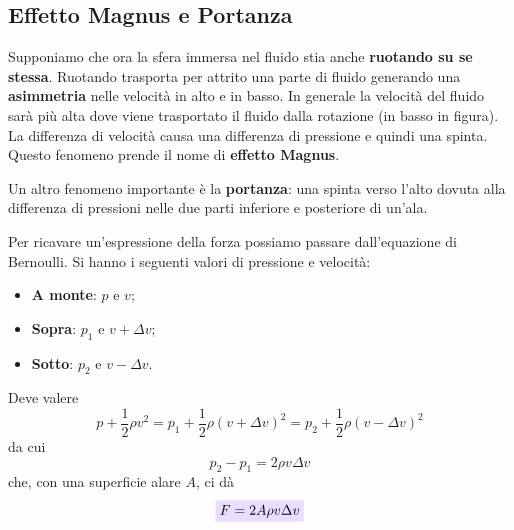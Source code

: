 \documentclass[x11names]{report}
\def\R{1.5}      %
\newcommand{\viola}[1]{\colorbox{yred}{$\displaystyle #1$}}
\begin{document}
	\subsection{Effetto Magnus e Portanza}
	Supponiamo che ora la sfera immersa nel fluido stia anche \textbf{ruotando su se stessa}. Ruotando trasporta per attrito una parte di fluido generando una \textbf{asimmetria} nelle velocità in alto e in basso. In generale la velocità del fluido sarà più alta dove viene trasportato il fluido dalla rotazione (in basso in figura). La differenza di velocità causa una differenza di pressione e quindi una spinta. Questo fenomeno prende il nome di \textbf{effetto Magnus}.
	\begin{center}
	\end{center}
	\vspace{2cm}
	Un altro fenomeno importante è la \textbf{portanza}: una spinta verso l'alto dovuta alla differenza di pressioni nelle due parti inferiore e posteriore di un'ala.
	
	Per ricavare un'espressione della forza possiamo passare dall'equazione di Bernoulli. Si hanno i seguenti valori di pressione e velocità:
	\begin{itemize}
		\item \textbf{A monte}: \(p\) e \(v\);
		\item \textbf{Sopra}: \(p_{1}\) e \(v + \Delta v\);
		\item \textbf{Sotto}: \(p_{2}\) e \(v - \Delta v\).
	\end{itemize}
	Deve valere
	\[ 
	p + \frac{1}{2}\rho v^2 = p_{1} + \frac{1}{2}\rho (v+\Delta v)^2= p_{2} + \frac{1}{2}\rho (v-\Delta v)^2
	\]
	da cui 
	\[ 
	p_{2} - p_{1} = 2 \rho v \Delta v
	\]
	che, con una superficie alare \(A\), ci dà
	\begin{equation}
		\viola{F = 2A \rho v \Delta v}
	\end{equation}
	
\end{document}

